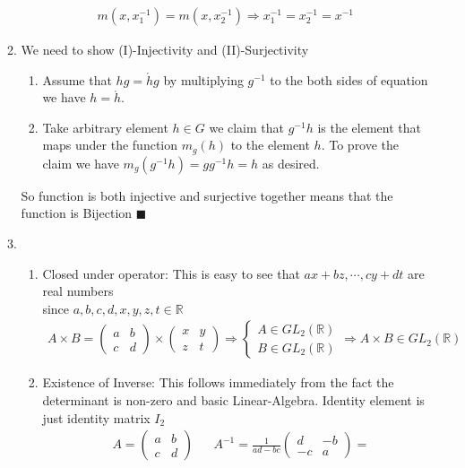 \documentclass{article}
\begin{document}
\begin{itemize}
\begin{enumerate}[label=(\alph*)]
\begin{align*}
				m(x,x_{1}^{-1}) = m(x,x_{2}^{-1}) \Rightarrow x_{1}^{-1} = x_{2}^{-1} = x^{-1}
			  \end{align*}
		  \item We need to show (I)-Injectivity and (II)-Surjectivity
			  \begin{enumerate}[label=(\Roman*)]
				  \item  Assume that $hg = \acute{h}g$ by multiplying $g^{-1}$ to the both sides of equation we have $h=\acute{h}$.
				  \item Take arbitrary element $h\in G$ we claim that $g^{-1}h$ is the element that maps under the function $m_g(h)$ to
					  the element $h$. To prove the claim we have $m_g(g^{-1}h) = gg^{-1}h = h$ as desired.
			  \end{enumerate}
			  So function is both injective and surjective together means that the function is Bijection $\blacksquare$
	  \newpage
		  \item
			  \begin{enumerate}[label=(\Roman*)]
				  \item Closed under operator: This is easy to see that $ax+bz, \cdots , cy+dt$ are real numbers\\
					  since $a,b,c,d,x,y,z,t\in\mathbb{R}$
					\begin{align*}
						A \times  B = 
						\left(\begin{matrix} a & b \\ c & d \end{matrix}\right) \times 
						\left(\begin{matrix} x & y \\ z & t \end{matrix}\right) \Rightarrow
						\left\{\begin{array}{l}
						A\in GL_{2}(\mathbb{R})\\
						B\in GL_2(\mathbb{R})
					\end{array}\right.
					\Rightarrow A \times B \in GL_2(\mathbb{R})
					\end{align*}
				\item Existence of Inverse: This follows immediately from the fact the determinant is non-zero and basic Linear-Algebra.
					Identity element is just identity matrix $I_2$ 
				\begin{align*}
					&A = \left(\begin{matrix} a & b \\ c & d \end{matrix}\right)
					&&A^{-1} = \frac{1}{ad-bc}\left(\begin{matrix} d & -b \\ -c & a \end{matrix}\right)=

\end{align*}
\end{enumerate}
\end{enumerate}
\end{itemize}
\end{document}

